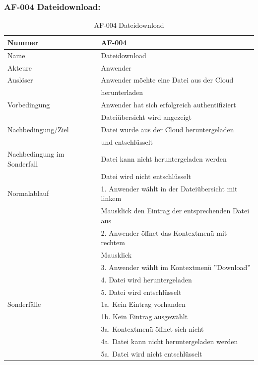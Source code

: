 \documentclass[13pt,a4paper,bibliography=totocnumbered,listof=totocnumbered]{scrartcl}
\begin{document}
\subsubsection{AF-004 Dateidownload:}
\begin{table}[!h]
	\centering
	\begin{tabular}{|l|l|}
		\hline
		Nummer & AF-004\\
		\hline
		Name & Dateidownload\\
		\hline
		Akteure & Anwender\\
		\hline
		Auslöser & Anwender möchte eine Datei aus der Cloud \\ & herunterladen\\
		\hline
		Vorbedingung & Anwender hat sich erfolgreich authentifiziert \\ & Dateiübersicht wird angezeigt\\
		\hline
		Nachbedingung/Ziel & Datei wurde aus der Cloud heruntergeladen \\ & und entschlüsselt \\
		\hline
		Nachbedingung im Sonderfall & Datei kann nicht heruntergeladen werden \\ & Datei wird nicht entschlüsselt\\
		\hline
		Normalablauf & 1. Anwender wählt in der Dateiübersicht mit linkem \\&Mausklick den Eintrag der entsprechenden Datei aus \\ & 2. Anwender öffnet das Kontextmenü mit rechtem\\& Mausklick \\ & 3. Anwender wählt im Kontextmenü ''Download'' \\  & 4. Datei wird heruntergeladen \\ & 5. Datei wird entschlüsselt \\
		\hline
		Sonderfälle & 1a. Kein Eintrag vorhanden\\& 1b. Kein Eintrag ausgewählt\\ & 3a. Kontextmenü öffnet sich nicht \\& 4a. Datei kann nicht heruntergeladen werden \\ & 5a. Datei wird nicht entschlüsselt\\
		\hline
	\end{tabular}
	\caption{AF-004 Dateidownload}
	\label{tab:AF-004 Dateidownload}
\end{table}
\pagebreak
\end{document}
